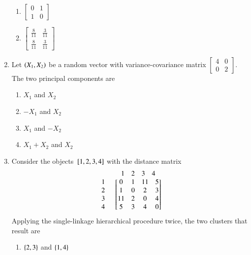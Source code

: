 \documentclass[journal]{IEEEtran}
\begin{document}
\begin{enumerate}
\begin{enumerate}
					\item $\begin{bmatrix} 0 & 1 \\ 1 & 0 \end{bmatrix}$
						\item $\begin{bmatrix} \frac{8}{11} & \frac{3}{11} \\ \frac{8}{11} & \frac{3}{11} \end{bmatrix}$
		\end{enumerate}
	\item Let $\left(X_1, X_2\right)$ be a random vector with variance-covariance matrix $\begin{bmatrix} 4 & 0\\0 & 2\end{bmatrix}$. The two principal components are
			\begin{enumerate}
				\item $X_1$ and $X_2$
				\item $-X_1$ and $X_2$
				\item $X_1$ and $-X_2$
				\item $X_1 + X_2$ and $X_2$
			\end{enumerate}
		\item Consider the objects ${}\left[1, 2, 3, 4\right]$ with the distance matrix 
			\begin{align*}
				\begin{array}{cc}
					& \begin{array}{c c c c} 1 & 2 & 3 & 4 \end{array}\\
						\begin{array}{c}
							1 \\ 
							2 \\
							3 \\
							4
						\end{array} &
						\begin{bmatrix}
							0 & 1 & 11 & 5 \\
							1 & 0 & 2 & 3 \\
							11 & 2 & 0 & 4 \\
							5 & 3 & 4 & 0
						\end{bmatrix}
				\end{array}
			\end{align*}
Applying the single-linkage hierarchical procedure twice, the two clusters that result are
\begin{enumerate}
    \item $\left\{2, 3\right\}$ and $\left\{1, 4\right\}$

\end{enumerate}
\end{enumerate}
\end{document}
